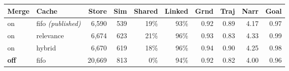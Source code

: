 \begin{tabular}{llrrrrrrrr}
\toprule
Merge & Cache & Store & Sim & Shared & Linked & Grnd & Traj & Narr & Goal \\
\midrule
on & fifo \emph{(published)} & 6,590 & 539 & 19\% & 93\% & 0.92 & 0.89 & 4.17 & 0.97 \\
on & relevance & 6,674 & 623 & 21\% & 96\% & 0.93 & 0.83 & 4.33 & 0.99 \\
on & hybrid & 6,670 & 619 & 18\% & 96\% & 0.94 & 0.90 & 4.25 & 0.98 \\
\textbf{off} & fifo & 20,669 & 813 & 0\% & 94\% & 0.92 & 0.82 & 4.00 & 0.96 \\
\bottomrule
\end{tabular}
